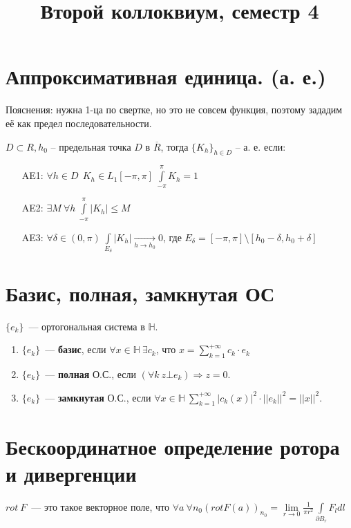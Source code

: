 \documentclass[paper=a4, fontsize=14pt]{article}
\author{}
\title{Второй коллоквиум, семестр 4}
\begin{document}
\section{Аппроксимативная единица. (а. е.)}

Пояснения: нужна 1-ца по свертке, но это не совсем функция, поэтому зададим её как предел последовательности.

$ D \subset R, h_0 $ -- предельная точка $ D $ в $ \overline{R} $, 
тогда $ \{K_h\}_{h \in D}$ -- а. е. если:
\begin{itemize}
\item[AE1: ] $ \forall h \in D ~~ K_h \in L_1[-\pi, \pi] ~ \int\limits_{-\pi}^{\pi} K_h = 1 $
\item[AE2: ] $ \exists M ~ \forall h ~ \int\limits_{-\pi}^{\pi} |K_h| \leq M $
\item[AE3: ] $ \forall \delta \in (0, \pi) ~  \int\limits_{E_\delta} | K_h | 
\underset{h \rightarrow h_0}{\rightarrow} 0  $, где $E_{\delta} = [-\pi,\pi] \setminus [h_0 - \delta, h_0 + \delta]$
\end{itemize}

\section{Базис, полная, замкнутая ОС}

$\{e_k\}$~--- ортогональная система в $\mathds{H}$.

\begin{enumerate}

\item $\{e_k\}$~--- \textbf{базис}, если $\forall x \in \mathds{H}\ \exists c_k$, что $x = \sum\limits_{k=1}^{+\infty} c_k \cdot e_k$

\item $\{e_k\}$~--- \textbf{полная} О.С., если $(\forall k ~ z \bot e_k) \Rightarrow z = 0$.

\item $\{e_k\}$~--- \textbf{замкнутая} О.С., если $\forall x \in \mathds{H} ~ \sum\limits_{k=1}^{+\infty} |c_k(x)|^2 \cdot ||e_k||^2 = ||x||^2$.

\end{enumerate}

\section{Бескоординатное определение ротора и дивергенции}
$rot\ F$~--- это такое векторное поле, что $\forall a \ \forall n_0 (rot F(a))_{n_0} = \lim\limits_{r\to 0} \frac{1}{\pi r^2} \int\limits_{\partial B_r} F_ldl$
\end{document}
